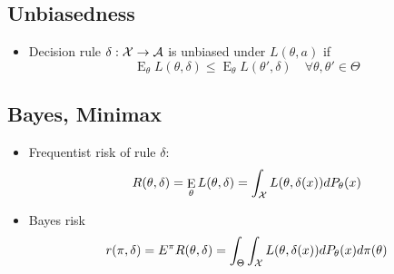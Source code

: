 \documentclass[fontsize=5pt]{scrartcl}
\DeclareMathOperator{\E}{E}
\begin{document}
\begin{multicols}{2}
\begin{itemize}
\begin{itemize}
  \end{itemize}

\end{itemize}

\subsection{Unbiasedness}

\begin{itemize}
\item Decision rule $\delta:{\cal X}\to{\cal A}$ is unbiased under
  $L(\theta,a)$ if
  \begin{equation}
    \E_{\theta}L(\theta,\delta)\leq \E_{\theta} L(\theta',
    \delta)\quad \forall\theta,\theta'\in\Theta
  \end{equation}

\end{itemize}

\subsection{Bayes, Minimax}

\begin{itemize}
\item Frequentist risk of rule $\delta$:
  \begin{equation}
    R(\theta,\delta) = \E_{\theta}L(\theta,\delta) = \int_{{\cal
        X}}L(\theta,\delta(x))d P_{\theta}(x)
  \end{equation}
\item Bayes risk
  \begin{equation}
    r(\pi,\delta) = E^{\pi}R(\theta,\delta) = \int_{\Theta}
    \int_{{\cal X}} L(\theta,\delta(x))dP_{\theta}(x)d\pi(\theta)
  \end{equation}


\end{itemize}
\end{multicols}
\end{document}
